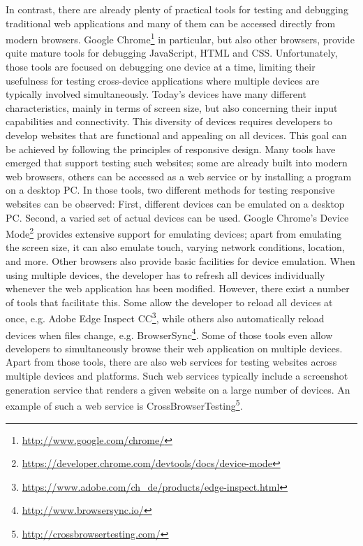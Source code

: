In contrast, there are already plenty of practical tools for testing and debugging traditional web applications and many of them can be accessed directly from modern browsers. Google Chrome\footnote{\url{http://www.google.com/chrome/}} in particular, but also other browsers, provide quite mature tools for debugging JavaScript, HTML and CSS. Unfortunately, those tools are focused on debugging one device at a time, limiting their usefulness for testing cross-device applications where multiple devices are typically involved simultaneously. Today's devices have many different characteristics, mainly in terms of screen size, but also concerning their input capabilities and connectivity. This diversity of devices requires developers to develop websites that are functional and appealing on all devices. This goal can be achieved by following the principles of responsive design. Many tools have emerged that support testing such websites; some are already built into modern web browsers, others can be accessed as a web service or by installing a program on a desktop PC. In those tools, two different methods for testing responsive websites can be observed: First, different devices can be emulated on a desktop PC. Second, a varied set of actual devices can be used. Google Chrome's Device Mode\footnote{\url{https://developer.chrome.com/devtools/docs/device-mode}} provides extensive support for emulating devices; apart from emulating the screen size, it can also emulate touch, varying network conditions, location, and more. Other browsers also provide basic facilities for device emulation. When using multiple devices, the developer has to refresh all devices individually whenever the web application has been modified. However, there exist a number of tools that facilitate this. Some allow the developer to reload all devices at once, e.g. Adobe Edge Inspect CC\footnote{\url{https://www.adobe.com/ch_de/products/edge-inspect.html}}, while others also automatically reload devices when files change, e.g. BrowserSync\footnote{\url{http://www.browsersync.io/}}. Some of those tools even allow developers to simultaneously browse their web application on multiple devices. Apart from those tools, there are also web services for testing websites across multiple devices and platforms. Such web services typically include a screenshot generation service that renders a given website on a large number of devices. An example of such a web service is CrossBrowserTesting\footnote{\url{http://crossbrowsertesting.com/}}.

